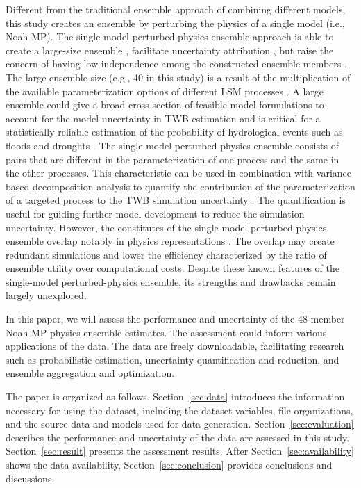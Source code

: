 \documentclass[essd]{copernicus}
\begin{document}
Different from the traditional ensemble approach of combining different models, this study creates an ensemble by perturbing the physics of a single model (i.e., Noah-MP). The single-model perturbed-physics ensemble approach is able to create a large-size ensemble \citep{yang2011JGRA, zhang2016JGRA, gan2019WRR}, facilitate uncertainty attribution \citep{zheng2019WRR}, but raise the concern of having low independence among the constructed ensemble members \citep{fei2021WRR}. The large ensemble size (e.g., 40 in this study) is a result of the multiplication of the available parameterization options of different LSM processes \citep{yang2011JGRA}. A large ensemble could give a broad cross-section of feasible model formulations to account for the model uncertainty in TWB estimation \citep{telteu2021GMD, mitchell2004JGRA} and is critical for a statistically reliable estimation of the probability of hydrological events such as floods and droughts \citep{troin2021WRR}. The single-model perturbed-physics ensemble consists of pairs that are different in the parameterization of one process and the same in the other processes. This characteristic can be used in combination with variance-based decomposition analysis to quantify the contribution of the parameterization of a targeted process to the TWB simulation uncertainty \citep{clark2011WRR, zheng2019WRR}. The quantification is useful for guiding further model development to reduce the simulation uncertainty. However, the constitutes of the single-model perturbed-physics ensemble overlap notably in physics representations \citep{fei2021WRR}. The overlap may create redundant simulations and lower the efficiency characterized by the ratio of ensemble utility over computational costs. Despite these known features of the single-model perturbed-physics ensemble, its strengths and drawbacks remain largely unexplored.

In this paper, we will assess the performance and uncertainty of the 48-member Noah-MP physics ensemble estimates. The assessment could inform various applications of the data. The data are freely downloadable, facilitating research such as probabilistic estimation, uncertainty quantification and reduction, and ensemble aggregation and optimization.

The paper is organized as follows. Section~\ref{sec:data} introduces the information necessary for using the dataset, including the dataset variables, file organizations, and the source data and models used for data generation. Section~\ref{sec:evaluation} describes the performance and uncertainty of the data are assessed in this study. Section~\ref{sec:result} presents the assessment results. After Section~\ref{sec:availability} shows the data availability, Section~\ref{sec:conclusion} provides conclusions and discussions.
\end{document}
